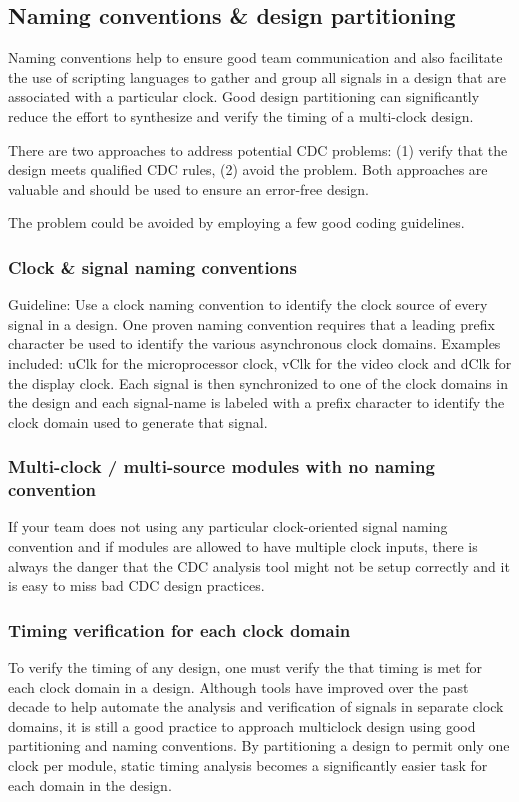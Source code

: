 \subsection{Naming conventions \& design partitioning}
Naming conventions help to ensure good team communication and also facilitate the use of
scripting languages to gather and group all signals in a design that are associated with a particular
clock. Good design partitioning can significantly reduce the effort to synthesize and verify the
timing of a multi-clock design. 

There are two approaches to address potential CDC problems: (1) verify that the design meets
qualified CDC rules, (2) avoid the problem. Both approaches are valuable and should be used to
ensure an error-free design.

The problem could be avoided by employing a few good coding guidelines.

\subsubsection{Clock \& signal naming conventions}
Guideline: Use a clock naming convention to identify  the clock source of every signal in a design.
One proven naming convention requires that a leading prefix character be used to identify the
various asynchronous clock domains. Examples included: uClk for the microprocessor clock, vClk for the video clock and dClk for the display clock.
Each signal is then synchronized to one of the clock domains in the design and each signal-name
is labeled with a prefix character to identify the clock domain used to generate that signal.

\subsubsection{Multi-clock / multi-source modules with no naming convention}
If your team does not using any particular clock-oriented signal naming convention and if
modules are allowed to have multiple clock inputs, there is always the danger that the CDC
analysis tool might not be setup correctly and it is easy to miss bad CDC design practices.

\subsubsection{Timing verification for each clock domain}
To verify the timing of any design, one must verify the that timing is met for each clock domain
in a design. Although tools have improved over the past decade to help automate the analysis and
verification of signals in separate clock domains, it is still a good practice to approach multiclock
design using good partitioning and naming conventions.
By partitioning a design to permit only one clock per module, static timing analysis becomes a
significantly easier task for each domain in the design.

